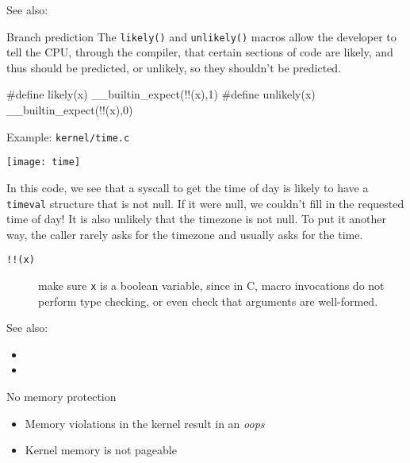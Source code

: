 See also: 

\begin{frame}[fragile=singleslide]
  \begin{block}{Branch prediction}
    The \texttt{likely()} and \texttt{unlikely()} macros allow the developer to tell the CPU,
    through the compiler, that certain sections of code are likely, and thus should be
    predicted, or unlikely, so they shouldn't be predicted.
  \end{block}
  \begin{center}
\begin{ccode}
#define   likely(x)  __builtin_expect(!!(x),1)
#define unlikely(x)  __builtin_expect(!!(x),0)
\end{ccode}
  \end{center}
  \begin{block}{Example: \texttt{kernel/time.c}}
    \begin{center}
      \texttt{[image: time]}
    \end{center}
  \end{block}
\end{frame}

In this code, we see that a syscall to get the time of day is likely to have a
\texttt{timeval} structure that is not null. If it were null, we couldn't fill in the
requested time of day! It is also unlikely that the timezone is not null. To put it
another way, the caller rarely asks for the timezone and usually asks for the time.

\begin{description}
\item[\texttt{!!(x)}] make sure \texttt{x} is a boolean variable, since in C, macro
  invocations do not perform type checking, or even check that arguments are
  well-formed. 
\end{description}

See also:
\begin{itemize}
\item {}
\item {}
\end{itemize}

\begin{frame}
  \begin{block}{No memory protection}
    \begin{itemize}
    \item Memory violations in the kernel result in an \emph{oops}
    \item Kernel memory is not pageable
    \end{itemize}
  \end{block}
\end{frame}

